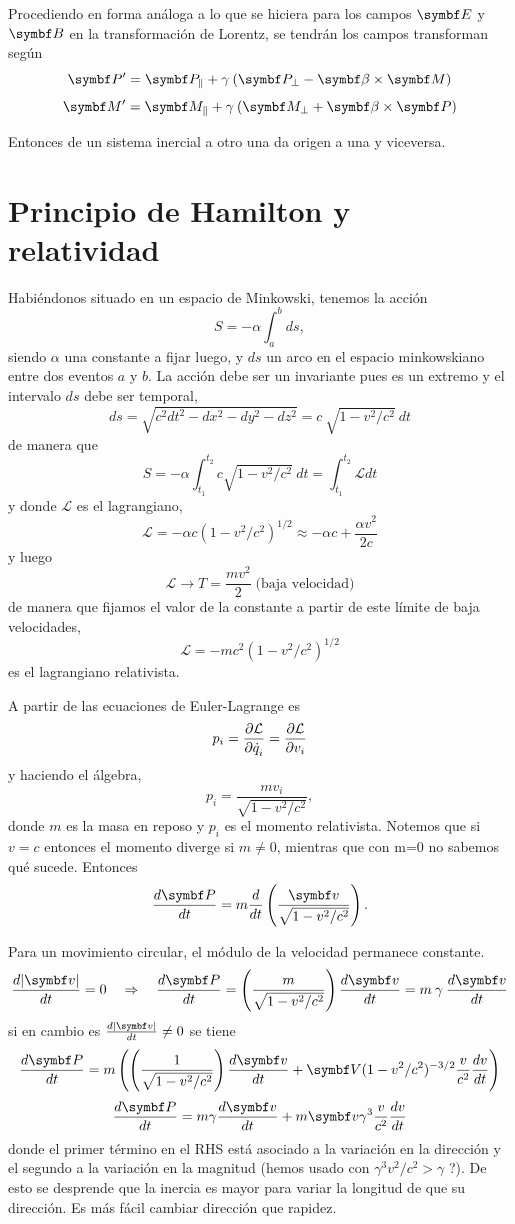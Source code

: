 \documentclass[10pt,oneside]{CBFT_book}
\begin{document}
Procediendo en forma análoga a lo que se hiciera para los campos $\vb{E}$ y $\vb{B}$
en la transformación de Lorentz, se tendrán los campos transforman según 
\[
	\vb{P}' = \vb{P}_\parallel + \gamma \: ( \vb{P}_\perp  - \pv{\beta}{M} )
\]
\[
	\vb{M}' = \vb{M}_\parallel + \gamma \: ( \vb{M}_\perp  + \pv{\beta}{P} )
\]

Entonces de un sistema inercial a otro una  da origen a una  y viceversa.

\section{Principio de Hamilton y relatividad}

Habiéndonos situado en un espacio de Minkowski, tenemos la acción
\[
	S = -\alpha \int_a^b ds,
\]
siendo $\alpha$ una constante a fijar luego, y $ds$ un arco en el espacio minkowskiano entre
dos eventos $a$ y $b$. 
La acción debe ser un invariante pues es un extremo y el intervalo $ds$ debe ser temporal,
\[
	ds = \sqrt{ c^2 dt^2 - dx^2 - dy^2 - dz^2 } = 
	c \: \sqrt{ 1 - v^2/c^2 } \: dt
\]
de manera que 
\[
	S = -\alpha \int_{t_1}^{t_2} c \sqrt{ 1 - v^2/c^2 } \: dt = 
	\int_{t_1}^{t_2} \mathcal{L} dt
\]
y donde $\mathcal{L}$ es el lagrangiano, 
\[
	\mathcal{L} = -\alpha c \left( 1 - v^2/c^2 \right)^{1/2} \approx -\alpha c + \frac{\alpha v^2}{2c}
\]
y luego 
\[
	\mathcal{L} \to T = \frac{m v^2}{2} \; \text{(baja velocidad)}
\]
de manera que fijamos el valor de la constante a partir de este límite de baja velocidades,
\[
	\mathcal{L} = -m c^2 \left( 1 - v^2/c^2 \right)^{1/2}
\]
es el lagrangiano relativista.

A partir de las ecuaciones de Euler-Lagrange es 
\[
	p_i = \frac{\partial^{\hspace{-0.05em}} {\mathcal{L}}}{\partial {\dot{q}_i}^{\hspace{-0.05em}}} = \frac{\partial^{\hspace{-0.05em}} {\mathcal{L}}}{\partial {v_i}^{\hspace{-0.05em}}}
\]
y haciendo el álgebra,
\[
	p_i = \frac{ m v_i }{\sqrt{ 1 - v^2/c^2 }},
\]
donde $m$ es la masa en reposo y $p_i$ es el momento relativista. 
Notemos que si $v=c$ entonces el momento diverge si $m\neq 0$, mientras que con m=0 no sabemos
qué sucede.
Entonces
\[
	\dtot{\vb{P}}{t} = m \dtot{}{t}\left( \frac{\vb{v}}{\sqrt{1 - v^2/c^2 }}\right).
\]

Para un movimiento circular, el módulo de la velocidad permanece constante.
\[
	\dtot{|\vb{v}|}{t} = 0 \quad \Rightarrow \quad \dtot{\vb{P}}{t} =
		\left( \frac{ m }{\sqrt{1 - v^2/c^2 }}\right) \dtot{\vb{v}}{t} =
		m \: \gamma \: \dtot{\vb{v}}{t}
\]
si en cambio es $ \dtot{|\vb{v}|}{t} \neq 0 $ se tiene 
\[
	\dtot{\vb{P}}{t} = m \left( \left( \frac{ 1 }{\sqrt{1 - v^2/c^2 }}\right) \dtot{\vb{v}}{t} 
	+ \vb{V} (1 - v^2/c^2)^{-3/2} \frac{v}{c^2} \dtot{v}{t} \right)
\]
\[
	\dtot{\vb{P}}{t} = m \gamma \dtot{\vb{v}}{t} + m \vb{v} \gamma^3 \frac{v}{c^2} \dtot{v}{t}
\]
donde el primer término en el RHS está asociado a la variación en la dirección y el segundo a la variación
en la magnitud (hemos usado con $ \gamma^3 v^2/c^2 > \gamma $ ?). De esto se desprende que la inercia es
mayor para variar la longitud de  que su dirección. Es más fácil cambiar dirección que rapidez.
\end{document}
